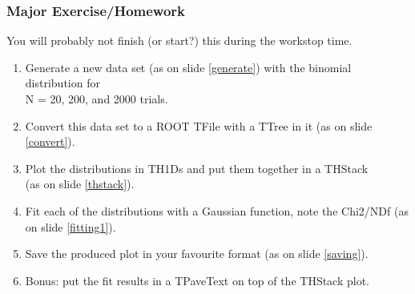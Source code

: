 \documentclass{beamer}
\begin{document}
\begin{frame}\frametitle{Major Exercise/Homework}
You will probably not finish (or start?) this during the workstop time.
\small{
\begin{enumerate}
\item Generate a new data set (as on slide \ref{generate}) with the binomial distribution for\\ N = 20, 200, and 2000 trials.
\item Convert this data set to a ROOT TFile with a TTree in it (as on slide \ref{convert}).
\item Plot the distributions in TH1Ds and put them together in a THStack \\(as on slide \ref{thstack}).
\item Fit each of the distributions with a Gaussian function, note the Chi2/NDf (as on slide \ref{fitting1}).
\item Save the produced plot in your favourite format (as on slide \ref{saving}).
\item Bonus: put the fit results in a TPaveText on top of the THStack plot.
\end{enumerate}
}
\end{frame}
\end{document}
